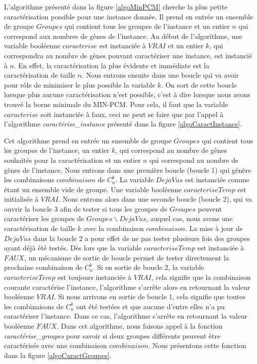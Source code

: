 L'algorithme présenté dans la figure \ref{algoMinPCM} cherche la plus petite caractérisation possible pour une instance donnée. Il prend en entrée un ensemble de groupe $Groupes$ qui contient tous les groupes de l'instance et un entier $n$ qui correspond aux nombres de gènes de l'instance. Au début de l'algorithme, une variable booléenne $caracterise$ est instanciée à $VRAI$ et un entier $k$, qui correspondra au nombre de gènes pouvant caractériser une instance, est instancié à $n$. En effet, la caractérisation la plus évidente et immédiate est la caractérisation de taille $n$. Nous entrons ensuite dans une boucle qui va avoir pour rôle de minimiser le plus possible la variable $k$. On sort de cette boucle lorsque plus aucune caractérisation n'est possible, c'est à dire lorsque nous avons trouvé la borne minimale du MIN-PCM. Pour cela, il faut que la variable $caracterise$ soit instanciée à faux, ceci ne peut se faire que par l'appel à l'algorithme \emph{caractérise\_instance} présenté dans la figure \ref{algoCaractInstance}.


Cet algorithme prend en entrée un ensemble de groupe $Groupes$ qui contient tous les groupes de l'instance, un entier $k$, qui correspond au nombre de gènes souhaités pour la caractérisation et un entier $n$ qui correspond au nombre de gènes de l'instance. Nous entrons dans une première boucle (boucle 1) qui génère les combinaisons $combinaison$ de $C_n^k$. La variable $DejaVus$ est instanciée comme étant un ensemble vide de groupe. Une variable booléenne $caracteriseTemp$ est initialisée à $VRAI$. Nous entrons alors dans une seconde boucle (boucle 2), qui va ouvrir la boucle 3 afin de tester si tous les groupes de $Groupes$ peuvent caractériser les groupes de $Groupes \backslash DejaVus$, auquel cas, nous avons une caractérisation de taille $k$ avec la combinaison $combinaison$. La mise à jour de $DejaVus$ dans la boucle 2 a pour effet de ne pas tester plusieurs fois des groupes ayant déjà été testés. Dès lors que la variable $caracteriseTemp$ est instanciée à $FAUX$, un mécanisme de sortie de boucle permet de tester directement la prochaine combinaison de $C_n^k$. Si en sortie de boucle 2, la variable $caracteriseTemp$ est toujours instanciée à $VRAI$, cela signifie que la combinaison courante caractérise l'instance, l'algorithme s'arrête alors en retournant la valeur booléenne $VRAI$. Si nous arrivons en sortie de boucle 1, cela signifie que toutes les combinaisons de $C_n^k$ ont été testées et que aucune d'entre elles n'a pu caractériser l'instance. Dans ce cas, l'algorithme s'arrête en retournant la valeur booléenne $FAUX$. Dans cet algorithme, nous faisons appel à la fonction \emph{caractérise\_groupes} pour savoir si deux groupes différents peuvent être caractérisés avec une combinaison $combinaison$. Nous présentons cette fonction dans la figure \ref{algoCaractGroupes}.



